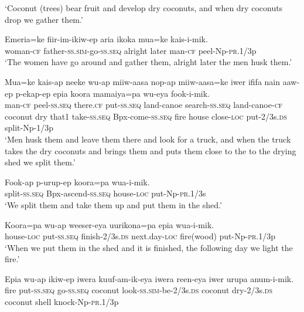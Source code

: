 \glt ‘Coconut (trees) bear fruit and develop dry coconuts, and when dry coconuts drop we gather them.’ \\
\z


\ea\label{ex:a:x5}
\gll  Emeria=ke  fiir-im-ikiw-ep  aria  ikoka  mua=ke  kais-i-mik. \\
woman-\textsc{cf}  father-\textsc{ss}.\textsc{sim}-go-\textsc{ss.seq}  alright  later  man-\textsc{cf}  peel-Np-\textsc{pr}.1/3p \\
\glt ‘The women have go around and gather them, alright later the men husk them.’ \\
\z


\ea\label{ex:a:x6}
\gll  Mua=ke  kais-ap  neeke  wu-ap  miiw-aasa  nop-ap               miiw-aasa=ke  iwer  ififa  nain  aaw-ep  p-ekap-ep  epia  koora                    mamaiya=pa  wu-eya  fook-i-mik. \\
man-\textsc{cf}  peel-\textsc{ss.seq}  there.\textsc{cf}  put-\textsc{ss.seq}  land-canoe  search-\textsc{ss.seq} land-canoe-\textsc{cf}  coconut  dry  that1  take-\textsc{ss.seq}  Bpx-come-\textsc{ss.seq}  fire  house      close-\textsc{loc}  put-2/3s.\textsc{ds}  split-Np-1/3p \\




\glt ‘Men husk them and leave them there and look for a truck, and when the truck takes the dry coconuts and brings them and puts them close to the to the drying shed we split them.’ \\
\z


\ea\label{ex:a:x7}
\gll  Fook-ap  p-urup-ep  koora=pa  wua-i-mik. \\
split-\textsc{ss.seq}  Bpx-ascend-\textsc{ss.seq}  house-\textsc{loc}  put-Np-\textsc{pr}.1/3s \\
\glt ‘We split them and take them up and put them in the shed.’ \\
\z


\ea\label{ex:a:x8}
\gll  Koora=pa  wu-ap  weeser-eya  uurikona=pa  epia  wua-i-mik. \\
house-\textsc{loc}  put-\textsc{ss.seq}  finish-2/3s.\textsc{ds}  next.day-\textsc{loc}  fire(wood)  put-Np-\textsc{pr}.1/3p \\
\glt ‘When we put them in the shed and it is finished, the following day we light the fire.’ \\
\z


\ea\label{ex:a:x9}
\gll  Epia  wu-ap  ikiw-ep  iwera  kuuf-am-ik-eya  iwera  reen-eya                  iwer  urupa  anum-i-mik. \\
fire  put-\textsc{ss.seq}  go-\textsc{ss.seq}  coconut  look-\textsc{ss}.\textsc{sim}-be-2/3s.\textsc{ds}  coconut  dry-2/3s.\textsc{ds}  coconut  shell  knock-Np-\textsc{pr}.1/3p \\


